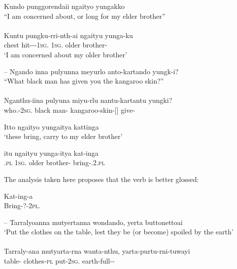 \documentclass{langscibook}
\begin{document}
\begin{xlist}
\ea\label{ex:5:22}
 Kundo       punggorendaii   	 ngaityo 		yungakko \\
\glt     	“I am concerned about, or long for my elder brother” \\
\citep{teichelmann_dictionary_1857} \\
\gll Kuntu	  pungku-rri-nth-ai   	  ngaityu		 yunga-ku \\
    chest	  hit---1\textsc{sg}.   1\textsc{sg}.             {older brother-}	\\
\glt `I am concerned about my older brother'
\z



--
\ea\label{ex:5:23}
Ngando inna 		pulyunna    meyurlo	 anto-kartando 		yungk-i?  \\
\glt     “What black man has given you the kangaroo skin?” \\
\citep[68]{teichelmann_outlines_1840} \\
\gll Nganthu-iina                    pulyuna    miyu-rlu  	nantu-kartantu		yungki? \\
who.-2\textsc{sg}.          black        man-  kangaroo-skin-[]       give-\\
\z




\ea\label{ex:5:24}
Itto		 ngaityo 		yungaitya	     kattinga \\
\glt `these bring, carry to my elder brother'
       
\gll itu                 ngaityu      	 yunga-itya	    kat-inga \\
       .\textsc{pl}         1\textsc{sg}.  	{older brother-}   bring-.2.\textsc{pl}                            \\
\z

The analysis taken here proposes that the verb is better glossed:

\ea
\gll Kat-ing-a \\
              Bring-?-2\textsc{pl}.                    \\

\z


--
\ea\label{ex:5:25}
Tarralyoanna   mutyertanna    wondando,		 yerta   buttonettoai \\
\glt `Put the clothes on the table, lest they be (or become) spoiled by the earth'\\
\citep[18]{teichelmann_outlines_1840} \\
\gll Tarraly-ana    mutyarta-rna         wanta-nthu,\footnotemark{}	 yarta-purtu-rni-tuwayi \\
 table-     clothes-\textsc{pl}              put-2\textsc{sg}.              earth-full--                            \\
\z




\end{xlist}
\end{document}
